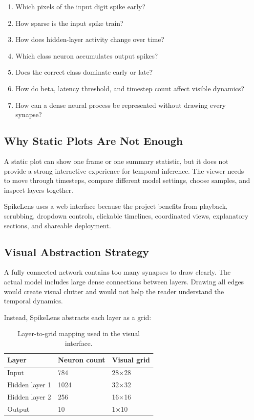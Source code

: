 \documentclass[11pt,a4paper]{article}
\newcommand{\projecttitle}{SpikeLens}
\begin{document}
\begin{enumerate}
    \item Which pixels of the input digit spike early?
    \item How sparse is the input spike train?
    \item How does hidden-layer activity change over time?
    \item Which class neuron accumulates output spikes?
    \item Does the correct class dominate early or late?
    \item How do beta, latency threshold, and timestep count affect visible dynamics?
    \item How can a dense neural process be represented without drawing every synapse?
\end{enumerate}

\subsection{Why Static Plots Are Not Enough}

A static plot can show one frame or one summary statistic, but it does not provide a strong interactive experience for temporal inference. The viewer needs to move through timesteps, compare different model settings, choose samples, and inspect layers together.

\projecttitle{} uses a web interface because the project benefits from playback, scrubbing, dropdown controls, clickable timelines, coordinated views, explanatory sections, and shareable deployment.

\subsection{Visual Abstraction Strategy}

A fully connected network contains too many synapses to draw clearly. The actual model includes large dense connections between layers. Drawing all edges would create visual clutter and would not help the reader understand the temporal dynamics.

Instead, \projecttitle{} abstracts each layer as a grid:

\begin{table}[H]
\centering
\caption{Layer-to-grid mapping used in the visual interface.}
\begin{tabular}{lll}
\toprule
Layer & Neuron count & Visual grid \\
\midrule
Input & 784 & 28$\times$28 \\
Hidden layer 1 & 1024 & 32$\times$32 \\
Hidden layer 2 & 256 & 16$\times$16 \\
Output & 10 & 1$\times$10 \\
\bottomrule
\end{tabular}
\end{table}
\end{document}
